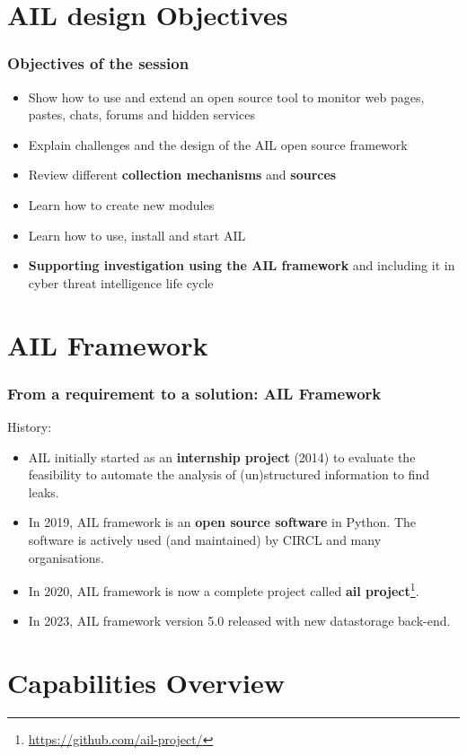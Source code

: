 \documentclass[10pt,aspectratio=169, colorlinks=true, linkcolor=circlBlue]{beamer}
\begin{document}
\section{AIL design Objectives}
\begin{frame}
\frametitle{Objectives of the session}
    \begin{itemize}
        \item Show how to use and extend an open source tool to monitor web pages, pastes, chats, forums and hidden services
        \item Explain challenges and the design of the AIL open source framework
        \item Review different {\bf collection mechanisms} and {\bf sources}
        \item Learn how to create new modules
        \item Learn how to use, install and start AIL
        \item {\bf Supporting investigation using the AIL framework} and including it in cyber threat intelligence life cycle
    \end{itemize}
\end{frame}

\section{AIL Framework}
\begin{frame}
    \frametitle{From a requirement to a solution: AIL Framework}
    \large{History:}
    \begin{itemize}
        \item AIL initially started as an \textbf{internship project} (2014) to evaluate the feasibility to automate the analysis of (un)structured information to find leaks.
        \item In 2019, AIL framework is an \textbf{open source software} in Python. The software is actively used (and maintained) by CIRCL and many organisations.
        \item In 2020, AIL framework is now a complete project called \textbf{ail project}\footnote{\url{https://github.com/ail-project/}}.
        \item In 2023, AIL framework version 5.0 released with new datastorage back-end.
    \end{itemize}
\end{frame}

\section{Capabilities Overview}
\end{document}
